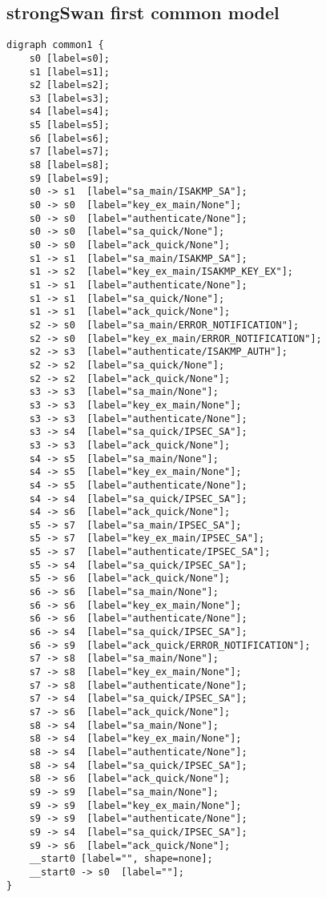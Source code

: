 \subsection*{strongSwan first common model}
\begin{lstlisting}[numbers=none]
digraph common1 {
	s0 [label=s0];
	s1 [label=s1];
	s2 [label=s2];
	s3 [label=s3];
	s4 [label=s4];
	s5 [label=s5];
	s6 [label=s6];
	s7 [label=s7];
	s8 [label=s8];
	s9 [label=s9];
	s0 -> s1  [label="sa_main/ISAKMP_SA"];
	s0 -> s0  [label="key_ex_main/None"];
	s0 -> s0  [label="authenticate/None"];
	s0 -> s0  [label="sa_quick/None"];
	s0 -> s0  [label="ack_quick/None"];
	s1 -> s1  [label="sa_main/ISAKMP_SA"];
	s1 -> s2  [label="key_ex_main/ISAKMP_KEY_EX"];
	s1 -> s1  [label="authenticate/None"];
	s1 -> s1  [label="sa_quick/None"];
	s1 -> s1  [label="ack_quick/None"];
	s2 -> s0  [label="sa_main/ERROR_NOTIFICATION"];
	s2 -> s0  [label="key_ex_main/ERROR_NOTIFICATION"];
	s2 -> s3  [label="authenticate/ISAKMP_AUTH"];
	s2 -> s2  [label="sa_quick/None"];
	s2 -> s2  [label="ack_quick/None"];
	s3 -> s3  [label="sa_main/None"];
	s3 -> s3  [label="key_ex_main/None"];
	s3 -> s3  [label="authenticate/None"];
	s3 -> s4  [label="sa_quick/IPSEC_SA"];
	s3 -> s3  [label="ack_quick/None"];
	s4 -> s5  [label="sa_main/None"];
	s4 -> s5  [label="key_ex_main/None"];
	s4 -> s5  [label="authenticate/None"];
	s4 -> s4  [label="sa_quick/IPSEC_SA"];
	s4 -> s6  [label="ack_quick/None"];
	s5 -> s7  [label="sa_main/IPSEC_SA"];
	s5 -> s7  [label="key_ex_main/IPSEC_SA"];
	s5 -> s7  [label="authenticate/IPSEC_SA"];
	s5 -> s4  [label="sa_quick/IPSEC_SA"];
	s5 -> s6  [label="ack_quick/None"];
	s6 -> s6  [label="sa_main/None"];
	s6 -> s6  [label="key_ex_main/None"];
	s6 -> s6  [label="authenticate/None"];
	s6 -> s4  [label="sa_quick/IPSEC_SA"];
	s6 -> s9  [label="ack_quick/ERROR_NOTIFICATION"];
	s7 -> s8  [label="sa_main/None"];
	s7 -> s8  [label="key_ex_main/None"];
	s7 -> s8  [label="authenticate/None"];
	s7 -> s4  [label="sa_quick/IPSEC_SA"];
	s7 -> s6  [label="ack_quick/None"];
	s8 -> s4  [label="sa_main/None"];
	s8 -> s4  [label="key_ex_main/None"];
	s8 -> s4  [label="authenticate/None"];
	s8 -> s4  [label="sa_quick/IPSEC_SA"];
	s8 -> s6  [label="ack_quick/None"];
	s9 -> s9  [label="sa_main/None"];
	s9 -> s9  [label="key_ex_main/None"];
	s9 -> s9  [label="authenticate/None"];
	s9 -> s4  [label="sa_quick/IPSEC_SA"];
	s9 -> s6  [label="ack_quick/None"];
	__start0 [label="", shape=none];
	__start0 -> s0  [label=""];
}
\end{lstlisting}
\newpage

